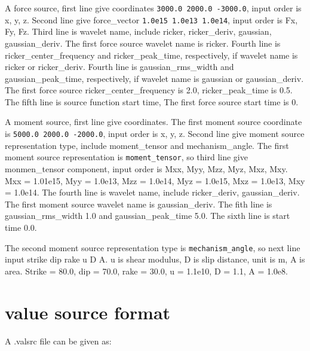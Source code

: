 A force source, first line give coordinates \texttt{3000.0 2000.0 -3000.0}, input order is x, y, z. Second line give force\_vector \texttt{1.0e15 1.0e13 1.0e14}, input order is Fx, Fy, Fz. Third line is wavelet name, include ricker, ricker\_deriv, gaussian, gaussian\_deriv. The first force source wavelet name is ricker. Fourth line is ricker\_center\_frequency and ricker\_peak\_time, respectively, if wavelet name is ricker or ricker\_deriv. Fourth line is gaussian\_rms\_width and gaussian\_peak\_time, respectively, if wavelet name is gaussian or gaussian\_deriv. The first force source ricker\_center\_frequency is 2.0, ricker\_peak\_time is 0.5. The fifth line is source function start time, The first force source start time is 0.

A moment source, first line give coordinates. The first moment source coordinate is \texttt{5000.0 2000.0 -2000.0}, input order is x, y, z. Second line give moment source representation type, include moment\_tensor and mechanism\_angle. The first moment source representation is \texttt{moment\_tensor}, so third line give monmen\_tensor component, input order is Mxx, Myy, Mzz, Myz, Mxz, Mxy. Mxx = 1.01e15, Myy = 1.0e13, Mzz = 1.0e14, Myz = 1.0e15, Mxz = 1.0e13, Mxy = 1.0e14. The fourth line is wavelet name, include ricker\_deriv, gaussian\_deriv. The first moment source wavelet name is gaussian\_deriv. The fith line is gaussian\_rms\_width 1.0 and gaussian\_peak\_time 5.0. The sixth line is start time 0.0.

The second moment source representation type is \texttt{mechanism\_angle}, so next line input strike dip rake u D A. u is shear modulus, D is slip distance, unit is m, A is area. Strike = 80.0,  dip = 70.0, rake = 30.0, u = 1.1e10, D = 1.1, A = 1.0e8.   

\section{value source format} \label{value source format}

A .valsrc file can be given as:

